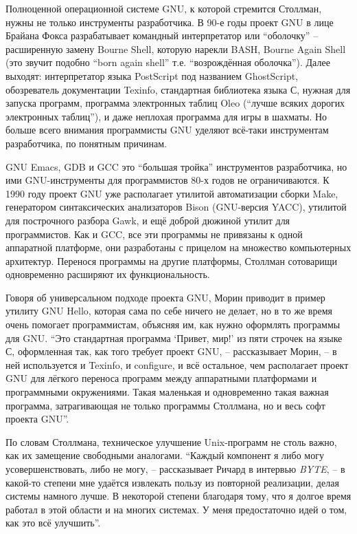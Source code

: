 Полноценной операционной системе GNU, к которой стремится Столлман, нужны не только инструменты разработчика. В 90-е годы проект GNU в лице Брайана Фокса разрабатывает командный интерпретатор или ``оболочку'' -- расширенную замену Bourne Shell, которую нарекли BASH, Bourne Again Shell (это звучит подобно ``born again shell'' т.е. ``возрождённая оболочка''). Далее выходят: интерпретатор языка PostScript под названием GhostScript, обозреватель документации Texinfo, стандартная библиотека языка С, нужная для запуска программ, программа электронных таблиц Oleo (``лучше всяких дорогих электронных таблиц''), и даже неплохая программа для игры в шахматы. Но больше всего внимания программисты GNU уделяют всё-таки инструментам разработчика, по понятным причинам.

GNU Emacs, GDB и GCC это ``большая тройка'' инструментов разработчика, но ими GNU-инструменты для программистов 80-х годов не ограничиваются. К 1990 году проект GNU уже располагает утилитой автоматизации сборки Make, генератором синтаксических анализаторов Bison (GNU-версия YACC), утилитой для построчного разбора Gawk, и ещё доброй дюжиной утилит для программистов. Как и GCC, все эти программы не привязаны к одной аппаратной платформе, они разработаны с прицелом на множество компьютерных архитектур. Перенося программы на другие платформы, Столлман сотоварищи одновременно расширяют их функциональность.

Говоря об универсальном подходе проекта GNU, Морин приводит в пример утилиту GNU Hello, которая сама по себе ничего не делает, но в то же время очень помогает программистам, объясняя им, как нужно оформлять программы для GNU. ``Это стандартная программа `Привет, мир!' из пяти строчек на языке С, оформленная так, как того требует проект GNU, -- рассказывает Морин, -- в ней используется и Texinfo, и configure, и всё остальное, чем располагает проект GNU для лёгкого переноса программ между аппаратными платформами и программными окружениями. Такая маленькая и одновременно такая важная программа, затрагивающая не только программы Столлмана, но и весь софт проекта GNU''.

По словам Столлмана, техническое улучшение Unix-программ не столь важно, как их замещение свободными аналогами. ``Каждый компонент я либо могу усовершенствовать, либо не могу, -- рассказывает Ричард в интервью \textit{BYTE}, -- в какой-то степени мне удаётся извлекать пользу из повторной реализации, делая системы намного лучше. В некоторой степени благодаря тому, что я долгое время работал в этой области и на многих системах. У меня предостаточно идей о том, как это всё улучшить''.

